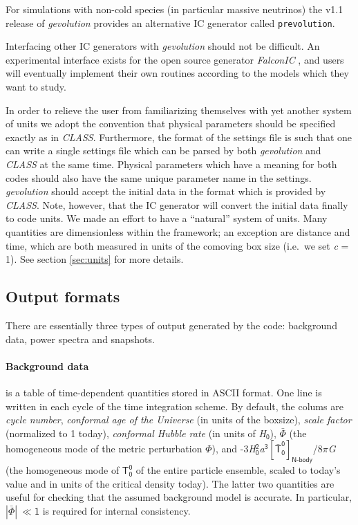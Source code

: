 \documentclass[a4paper,10pt]{article}
\begin{document}
For simulations with non-cold species (in particular massive neutrinos) the v1.1 release of \textit{gevolution} provides an alternative IC
generator called \texttt{prevolution}.

Interfacing other IC generators with \textit{gevolution} should not be difficult. An experimental interface exists for the
open source generator \textit{FalconIC} \cite{Valkenburg:2015dsa}, and users will eventually implement their own routines according to the
models which they want to study.

In order to relieve the user from familiarizing themselves with yet another system of units we adopt the convention that physical parameters
should be specified exactly as in \textit{CLASS}. Furthermore, the format of the settings file is such that one can write a single settings
file which can be parsed by both \textit{gevolution} and \textit{CLASS} at the same time. Physical parameters which have a meaning for both
codes should also have the same unique parameter name in the settings. \textit{gevolution} should accept the initial data in the format
which is provided by \textit{CLASS}. Note, however, that the IC generator will convert the initial data finally to code units. We made an
effort to have a ``natural'' system of units. Many quantities are dimensionless within the framework; an exception are distance and time,
which are both measured in units of the comoving box size (i.e.\ we set \textit{c} = 1). See section \ref{sec:units} for more details.

\subsection{Output formats}
\label{sec:output}

There are essentially three types of output generated by the code: background data, power spectra and snapshots.

\paragraph{Background data} is a table of time-dependent quantities stored in ASCII format. One line is written in each cycle of the time
integration scheme. By default, the colums are \textit{cycle number}, \textit{conformal age of the Universe} (in units of the boxsize),
\textit{scale factor} (normalized to 1 today), \textit{conformal Hubble rate} (in units of \textit{H}${}_\mathsf{0}$), $\bar{\mathsf{\Phi}}$
(the homogeneous mode of the metric perturbation $\mathsf{\Phi}$), and -3\textit{H}${}_\mathsf{0}^\mathsf{2}$\textit{a}$^\mathsf{3}
[\mathsf{\bar{T}^0_0}]_\mathsf{N\text{-}body}$/8$\mathsf{\pi}$\textit{G} (the homogeneous mode of $\mathsf{T^0_0}$ of the entire particle
ensemble, scaled to today's value and in units of the critical density today). The latter two quantities are useful for checking that the
assumed background model is accurate. In particular, $|\bar{\mathsf{\Phi}}|~ \mathsf{\ll 1}$ is required for internal consistency.
\end{document}
